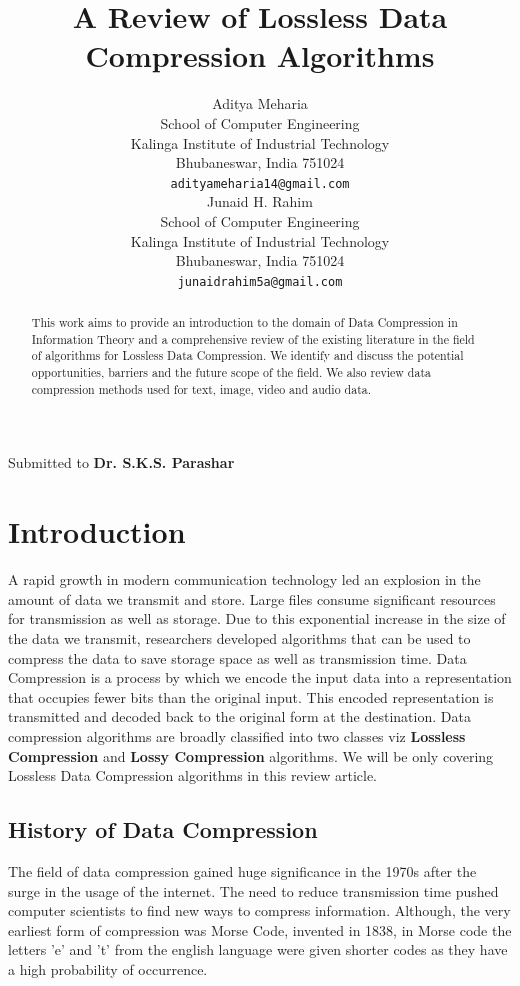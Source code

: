 \documentclass{article}
\title{A Review of Lossless Data Compression Algorithms}
\author{
	Aditya Meharia\\
	School of Computer Engineering\\
	Kalinga Institute of Industrial Technology\\
	Bhubaneswar, India 751024 \\
	\texttt{adityameharia14@gmail.com} \\
	\And
   	Junaid H. Rahim\\
	School of Computer Engineering\\
	Kalinga Institute of Industrial Technology\\
	Bhubaneswar, India 751024 \\
	\texttt{junaidrahim5a@gmail.com} \\	
}
\begin{document}
\maketitle


\begin{abstract}
This work aims to provide an introduction to the domain of Data Compression in Information Theory and a comprehensive review of the existing literature in the field of algorithms for Lossless Data Compression. We identify and discuss the potential opportunities, barriers and the future scope of the field. We also review data compression methods used for text, image, video and  audio data.
\end{abstract}



\begin{center}
	\small{Submitted to \textbf{Dr. S.K.S. Parashar}}
\end{center}


\section{Introduction}

A rapid growth in modern communication technology led an explosion in the amount of data we transmit and store. Large files consume significant resources for transmission as well as storage. Due to this exponential increase in the size of the data we transmit, researchers developed algorithms that can be used to compress the data to save storage space as well as transmission time. Data Compression is a process by which we encode the input data into a representation that occupies fewer bits than the original input. This encoded representation is transmitted and decoded back to the original form at the destination. Data compression algorithms are broadly classified into two classes viz \textbf{Lossless Compression} and \textbf{Lossy Compression} algorithms. We will be only covering Lossless Data Compression algorithms in this review article.

\subsection{History of Data Compression}

The field of data compression gained huge significance in the 1970s after the surge in the usage of the internet. The need to reduce transmission time pushed computer scientists to find new ways to compress information. Although, the very earliest form of compression was Morse Code, invented in 1838, in Morse code the letters 'e' and 't' from the english language were given shorter codes as they have a high probability of occurrence.
\end{document}
